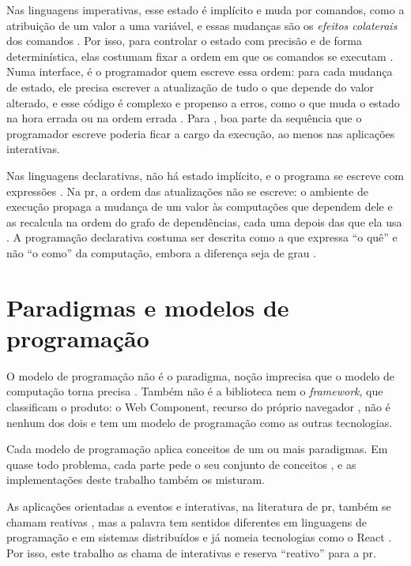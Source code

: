 Nas linguagens imperativas, esse estado é implícito e muda por comandos,
como a atribuição de um valor a uma variável, e essas mudanças são os
\emph{efeitos colaterais} dos comandos \cite[p. 361]{hudak1989}.
Por isso, para controlar o estado com precisão e de forma determinística,
elas costumam fixar a ordem em que os comandos se executam
\cite[p. 361]{hudak1989}.
Numa interface, é o programador quem escreve essa ordem: para cada mudança
de estado, ele precisa escrever a atualização de tudo o que depende do
valor alterado, e esse código é complexo e propenso a erros, como o que
muda o estado na hora errada ou na ordem errada
\cite[p. 52:2]{bainomugisha2013}.
Para \textcite[p. 929]{edwards2009}, boa parte da sequência que o
programador escreve poderia ficar a cargo da execução, ao menos nas
aplicações interativas.

Nas linguagens declarativas, não há estado implícito, e o programa se
escreve com expressões \cite[p. 361]{hudak1989}.
Na \gls{pr}, a ordem das atualizações não se escreve: o ambiente de
execução propaga a mudança de um valor às computações que dependem dele
e as recalcula na ordem do grafo de dependências, cada uma depois das que
ela usa \cite[p. 52:5 e 52:7]{bainomugisha2013}.
A programação declarativa costuma ser descrita como a que expressa “o
quê” e não “o como” da computação, embora a diferença seja de grau
\cite[p. 361]{hudak1989}.
\section{Paradigmas e modelos de programação}
\label{sec:paradigmas-e-modelos-de-programacao}

O modelo de programação não é o paradigma, noção imprecisa que o modelo
de computação torna precisa \cite[p. xiii]{vanroy2004}.
Também não é a biblioteca nem o \emph{framework}, que classificam o produto: o
Web Component, recurso do próprio navegador \cite{mozilla2026}, não é
nenhum dos dois e tem um modelo de programação como as outras
tecnologias.

Cada modelo de programação aplica conceitos de um ou mais paradigmas.
Em quase todo problema, cada parte pede o seu conjunto de conceitos
\cite[p. 10]{vanroy2009}, e as implementações deste trabalho também os
misturam.

As aplicações orientadas a eventos e interativas, na literatura de
\gls{pr}, também se chamam reativas \cite[p. 1125]{salvaneschi2017}, mas
a palavra tem sentidos diferentes em linguagens de programação e em sistemas
distribuídos \cite[5:1]{myter2019} e já nomeia tecnologias como o React
\cite[p. 13]{grolaux2026}.
Por isso, este trabalho as chama de interativas e reserva “reativo” para a
\gls{pr}.

